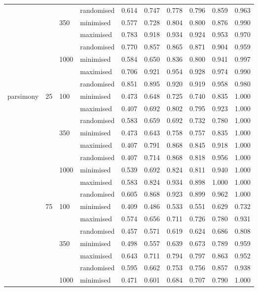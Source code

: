 \begin{longtable}{llllrrrrrr}
   &  &  & randomised & 0.614 & 0.747 & 0.778 & 0.796 & 0.859 & 0.963 \\ 
   &  & 350 & minimised & 0.577 & 0.728 & 0.804 & 0.800 & 0.876 & 0.990 \\ 
   &  &  & maximised & 0.783 & 0.918 & 0.934 & 0.924 & 0.953 & 0.970 \\ 
   &  &  & randomised & 0.770 & 0.857 & 0.865 & 0.871 & 0.904 & 0.959 \\ 
   &  & 1000 & minimised & 0.584 & 0.650 & 0.836 & 0.800 & 0.941 & 0.997 \\ 
   &  &  & maximised & 0.706 & 0.921 & 0.954 & 0.928 & 0.974 & 0.990 \\ 
   &  &  & randomised & 0.851 & 0.895 & 0.920 & 0.919 & 0.958 & 0.980 \\ 
  parsimony & 25 & 100 & minimised & 0.473 & 0.648 & 0.725 & 0.740 & 0.835 & 1.000 \\ 
   &  &  & maximised & 0.407 & 0.692 & 0.802 & 0.795 & 0.923 & 1.000 \\ 
   &  &  & randomised & 0.583 & 0.659 & 0.692 & 0.732 & 0.780 & 1.000 \\ 
   &  & 350 & minimised & 0.473 & 0.643 & 0.758 & 0.757 & 0.835 & 1.000 \\ 
   &  &  & maximised & 0.407 & 0.791 & 0.868 & 0.845 & 0.918 & 1.000 \\ 
   &  &  & randomised & 0.407 & 0.714 & 0.868 & 0.818 & 0.956 & 1.000 \\ 
   &  & 1000 & minimised & 0.539 & 0.692 & 0.824 & 0.811 & 0.940 & 1.000 \\ 
   &  &  & maximised & 0.583 & 0.824 & 0.934 & 0.898 & 1.000 & 1.000 \\ 
   &  &  & randomised & 0.605 & 0.868 & 0.923 & 0.899 & 0.962 & 1.000 \\ 
   & 75 & 100 & minimised & 0.409 & 0.486 & 0.533 & 0.551 & 0.629 & 0.732 \\ 
   &  &  & maximised & 0.574 & 0.656 & 0.711 & 0.726 & 0.780 & 0.931 \\ 
   &  &  & randomised & 0.457 & 0.571 & 0.619 & 0.624 & 0.686 & 0.808 \\ 
   &  & 350 & minimised & 0.498 & 0.557 & 0.639 & 0.673 & 0.789 & 0.959 \\ 
   &  &  & maximised & 0.643 & 0.711 & 0.794 & 0.797 & 0.863 & 0.952 \\ 
   &  &  & randomised & 0.595 & 0.662 & 0.753 & 0.756 & 0.857 & 0.938 \\ 
   &  & 1000 & minimised & 0.471 & 0.601 & 0.684 & 0.707 & 0.790 & 1.000 \\ 

\end{longtable}
